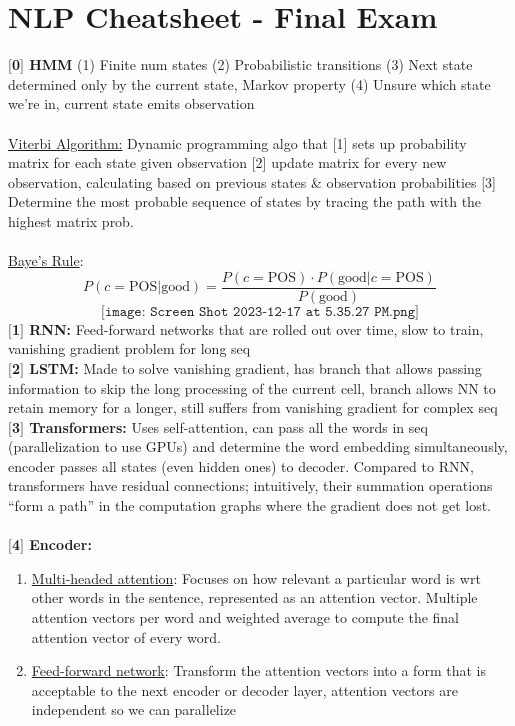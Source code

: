 \section{NLP Cheatsheet - Final Exam}
\textbf{$[$0$]$ HMM} (1) Finite num states (2) Probabilistic transitions (3) Next state determined only by the current state, Markov property (4) Unsure which state we’re in, current state emits observation \\
\\
\underline{Viterbi Algorithm:} Dynamic programming algo that [1] sets up probability matrix for each state given observation [2] update matrix for every new observation, calculating based on previous states \& observation probabilities [3] Determine the most probable sequence of states by tracing the path with the highest matrix prob.\\
\\
\underline{Baye's Rule}:
$$
P(c = \text{POS}|\text{good}) = \frac{P(c = \text{POS}) \cdot P(\text{good}|c = \text{POS})}{P(\text{good})}
$$
$$
\texttt{[image: Screen Shot 2023-12-17 at 5.35.27 PM.png]}
$$
\textbf{$[$1$]$ RNN:} Feed-forward networks that are rolled out over time, slow to train, vanishing gradient problem for long seq\\
\textbf{$[$2$]$ LSTM:} Made to solve vanishing gradient, has branch that allows passing information to skip the long processing of the current cell, branch allows NN to retain memory for a longer, still suffers from vanishing gradient for complex seq\\
\textbf{$[$3$]$ Transformers:} Uses self-attention, can pass all the words in seq (parallelization to use GPUs) and determine the word embedding simultaneously, encoder passes all states (even hidden ones) to decoder. Compared to RNN, transformers have residual connections; intuitively, their summation operations ``form a path'' in the computation graphs where the gradient does not get lost. \\
\\
\textbf{$[$4$]$ Encoder:}
\begin{enumerate}
    \item \underline{Multi-headed attention}: Focuses on how relevant a particular word is wrt other words in the sentence, represented as an attention vector. Multiple attention vectors per word and weighted average to compute the final attention vector of every word.
    \item \underline{Feed-forward network}: Transform the attention vectors into a form that is acceptable to the next encoder or decoder layer, attention vectors are independent so we can parallelize
\end{enumerate}
